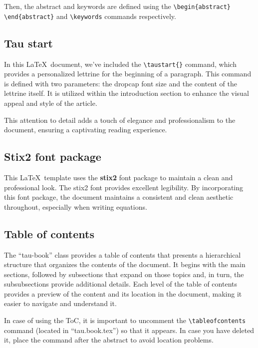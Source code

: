 \documentclass[10pt,a4paper,twoside]{tau-book}
\begin{document}
            Then, the abstract and keywords are defined using the \verb*|\begin{abstract} \end{abstract}| and \verb*|\keywords| commands respectively.
		
    \subsection{Tau start}

        In this \LaTeX\ document, we've included the \verb*|\taustart{}| command, which provides a personalized lettrine for the beginning of a paragraph. This command is defined with two parameters: the dropcap font size and the content of the lettrine itself. It is utilized within the introduction section to enhance the visual appeal and style of the article.

        This attention to detail adds a touch of elegance and professionalism to the document, ensuring a captivating reading experience.

    \subsection{Stix2 font package}

        This \LaTeX\ template uses the \textbf{stix2} font package to maintain a clean and professional look. The stix2 font provides excellent legibility. By incorporating this font package, the document maintains a consistent and clean aesthetic throughout, especially when writing equations. 

    \subsection{Table of contents}

        The ``tau-book'' class provides a table of contents that presents a hierarchical structure that organizes the contents of the document. It begins with the main sections, followed by subsections that expand on those topics and, in turn, the subsubsections provide additional details. Each level of the table of contents provides a preview of the content and its location in the document, making it easier to navigate and understand it.
        
        In case of using the ToC, it is important to uncomment the \verb*|\tableofcontents| command (located in ``tau.book.tex'') so that it appears. In case you have deleted it, place the command after the abstract to avoid location problems.
\end{document}
